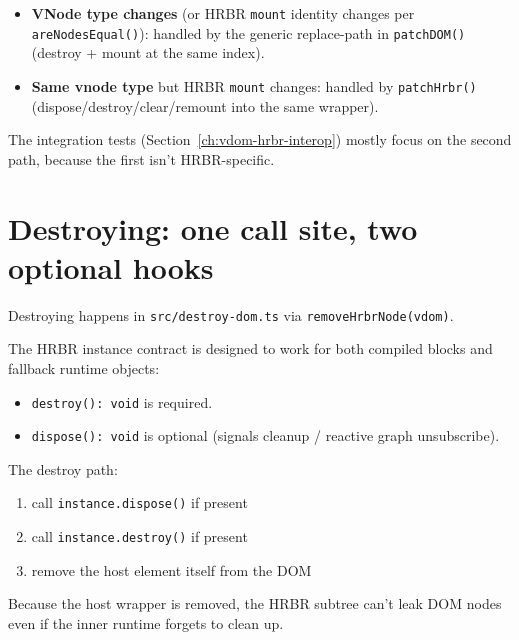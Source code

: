 \begin{itemize}
\item \textbf{VNode type changes} (or HRBR \texttt{mount} identity changes per \texttt{areNodesEqual()}): handled by the generic replace-path in \texttt{patchDOM()} (destroy + mount at the same index).
\item \textbf{Same vnode type} but HRBR \texttt{mount} changes: handled by \texttt{patchHrbr()} (dispose/destroy/clear/remount into the same wrapper).
\end{itemize}

The integration tests (Section~\ref{ch:vdom-hrbr-interop}) mostly focus on the second path, because the first isn't HRBR-specific.

\section{Destroying: one call site, two optional hooks}

Destroying happens in \texttt{src/destroy-dom.ts} via \texttt{removeHrbrNode(vdom)}.

The HRBR instance contract is designed to work for both compiled blocks and fallback runtime objects:

\begin{itemize}
\item \texttt{destroy(): void} is required.
\item \texttt{dispose(): void} is optional (signals cleanup / reactive graph unsubscribe).
\end{itemize}

The destroy path:

\begin{enumerate}
\item call \texttt{instance.dispose()} if present
\item call \texttt{instance.destroy()} if present
\item remove the host element itself from the DOM
\end{enumerate}

Because the host wrapper is removed, the HRBR subtree can't leak DOM nodes even if the inner runtime forgets to clean up.

